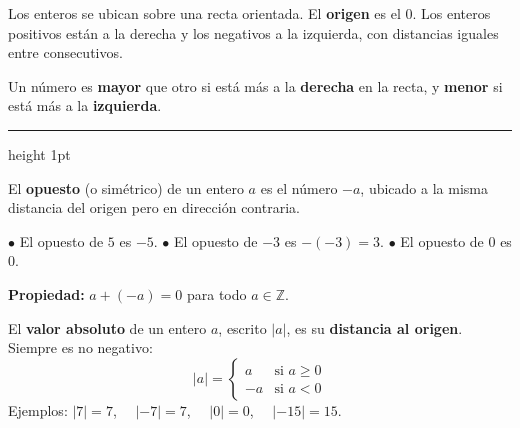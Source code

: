 \documentclass[11pt, letterpaper]{article}
\newcommand{\subbloque}[1]{%
  \vspace{14pt}
  \noindent{\large\bfseries\color{zenitnavy} #1}\par
  \vspace{4pt}\hrule height 1pt\vspace{8pt}}
\begin{document}
\begin{tcolorbox}[importantbox, title={Representaci\'on en la recta num\'erica}]
Los enteros se ubican sobre una recta orientada. El \textbf{origen} es el 0. Los enteros positivos est\'an a la derecha y los negativos a la izquierda, con distancias iguales entre consecutivos.

\begin{center}
\end{center}

Un n\'umero es \textbf{mayor} que otro si est\'a m\'as a la \textbf{derecha} en la recta, y \textbf{menor} si est\'a m\'as a la \textbf{izquierda}.
\end{tcolorbox}

\subbloque{1.3 Opuesto y valor absoluto}
\label{sub:1.3}

\begin{tcolorbox}[importantbox, title={Opuesto de un n\'umero entero}]
El \textbf{opuesto} (o sim\'etrico) de un entero $a$ es el n\'umero $-a$, ubicado a la misma distancia del origen pero en direcci\'on contraria.

$\bullet$ El opuesto de $5$ es $-5$. \quad $\bullet$ El opuesto de $-3$ es $-(-3)=3$. \quad $\bullet$ El opuesto de $0$ es $0$.

\textbf{Propiedad:} $a+(-a)=0$ para todo $a\in\mathbb{Z}$.
\end{tcolorbox}

\begin{tcolorbox}[importantbox, title={Valor absoluto}]
El \textbf{valor absoluto} de un entero $a$, escrito $|a|$, es su \textbf{distancia al origen}. Siempre es no negativo:
$$|a| = \begin{cases} a & \text{si } a \geq 0 \\ -a & \text{si } a < 0 \end{cases}$$
Ejemplos: $|7|=7$, $\quad |-7|=7$, $\quad |0|=0$, $\quad |-15|=15$.
\end{tcolorbox}
\end{document}
